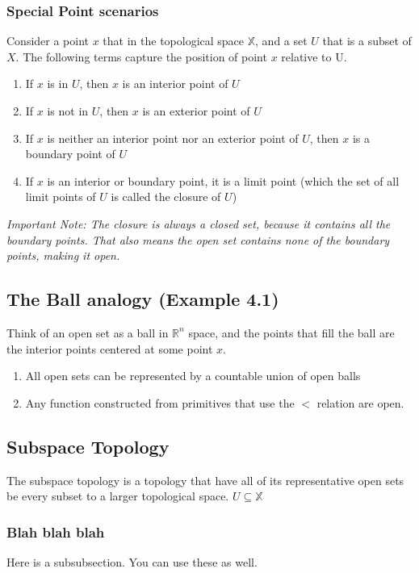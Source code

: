 \documentclass[11pt]{article}
\begin{document}
\subsubsection{Special Point scenarios}
Consider a point $x$ that in the topological space $\mathbb{X}$, and a set $U$ that is a subset of $X$. The following terms
capture the position of point $x$ relative to U.
\begin{enumerate}
  \item If $x$ is in $U$, then $x$ is an interior point of $U$
  \item If $x$ is not in $U$, then $x$ is an exterior point of $U$
  \item If $x$ is neither an interior point nor an exterior point of $U$, then $x$ is a boundary point of $U$
  \item If $x$ is an interior or boundary point, it is a limit point (which the set of all limit points of $U$ 
  is called the closure of $U$)
\end{enumerate}

\em Important Note: The closure is always a closed set, because it contains all the boundary points. That also means
the open set contains none of the boundary points, making it open.

\subsection{The Ball analogy (Example 4.1)}
Think of an open set as a ball in $\mathbb{R}^n$ space, and the points that fill the ball are the interior points
centered at some point $x$.

\begin{enumerate}
  \item All open sets can be represented by a countable union of open balls
  \item Any function constructed from primitives that use the $<$ relation are open.
\end{enumerate}

\subsection{Subspace Topology}
The subspace topology is a topology that have all of its representative open sets be every subset to a larger 
topological space. $U \subseteq \mathbb{X}$

\subsubsection{Blah blah blah}
Here is a subsubsection. You can use these as well.
\end{document}
